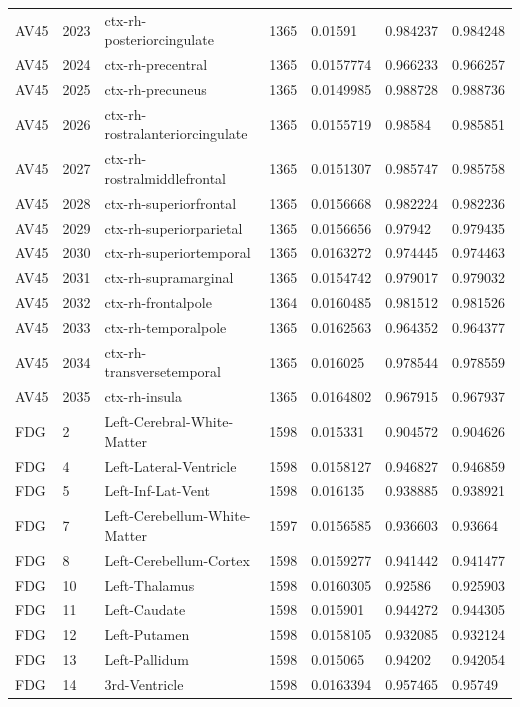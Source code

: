 \begin{landscape}
\begin{longtable}{lllllll}
AV45 & 2023 & ctx-rh-posteriorcingulate & 1365 & 0.01591 & 0.984237 & 0.984248 \\
AV45 & 2024 & ctx-rh-precentral & 1365 & 0.0157774 & 0.966233 & 0.966257 \\
AV45 & 2025 & ctx-rh-precuneus & 1365 & 0.0149985 & 0.988728 & 0.988736 \\
AV45 & 2026 & ctx-rh-rostralanteriorcingulate & 1365 & 0.0155719 & 0.98584 & 0.985851 \\
AV45 & 2027 & ctx-rh-rostralmiddlefrontal & 1365 & 0.0151307 & 0.985747 & 0.985758 \\
AV45 & 2028 & ctx-rh-superiorfrontal & 1365 & 0.0156668 & 0.982224 & 0.982236 \\
AV45 & 2029 & ctx-rh-superiorparietal & 1365 & 0.0156656 & 0.97942 & 0.979435 \\
AV45 & 2030 & ctx-rh-superiortemporal & 1365 & 0.0163272 & 0.974445 & 0.974463 \\
AV45 & 2031 & ctx-rh-supramarginal & 1365 & 0.0154742 & 0.979017 & 0.979032 \\
AV45 & 2032 & ctx-rh-frontalpole & 1364 & 0.0160485 & 0.981512 & 0.981526 \\
AV45 & 2033 & ctx-rh-temporalpole & 1365 & 0.0162563 & 0.964352 & 0.964377 \\
AV45 & 2034 & ctx-rh-transversetemporal & 1365 & 0.016025 & 0.978544 & 0.978559 \\
AV45 & 2035 & ctx-rh-insula & 1365 & 0.0164802 & 0.967915 & 0.967937 \\
FDG & 2 & Left-Cerebral-White-Matter & 1598 & 0.015331 & 0.904572 & 0.904626 \\
FDG & 4 & Left-Lateral-Ventricle & 1598 & 0.0158127 & 0.946827 & 0.946859 \\
FDG & 5 & Left-Inf-Lat-Vent & 1598 & 0.016135 & 0.938885 & 0.938921 \\
FDG & 7 & Left-Cerebellum-White-Matter & 1597 & 0.0156585 & 0.936603 & 0.93664 \\
FDG & 8 & Left-Cerebellum-Cortex & 1598 & 0.0159277 & 0.941442 & 0.941477 \\
FDG & 10 & Left-Thalamus & 1598 & 0.0160305 & 0.92586 & 0.925903 \\
FDG & 11 & Left-Caudate & 1598 & 0.015901 & 0.944272 & 0.944305 \\
FDG & 12 & Left-Putamen & 1598 & 0.0158105 & 0.932085 & 0.932124 \\
FDG & 13 & Left-Pallidum & 1598 & 0.015065 & 0.94202 & 0.942054 \\
FDG & 14 & 3rd-Ventricle & 1598 & 0.0163394 & 0.957465 & 0.95749 \\

\end{longtable}
\end{landscape}
